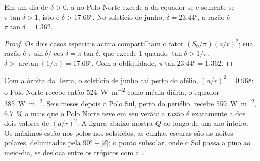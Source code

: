 \begin{proposition}\label{prop:b1:radiation-heat-transport:polar-summer}
Em um dia de  $\delta > 0$, a  no Polo Norte excede a do equador se
e somente se $\pi\tan\delta > 1$, isto é $\delta >
\ang{17.66}$. No solstício de junho, $\delta = \ang{23.44}$, a razão é $\pi\tan
\delta = 1.362$.
\end{proposition}

\begin{proof}
Os dois casos especiais acima compartilham o fator $(S_0/\pi)(a/r)^2$; sua razão é
$\pi\sin\delta/\cos\delta = \pi\tan\delta$, que excede 1 quando $\tan\delta >
1/\pi$, $\delta > \arctan(1/\pi) = \ang{17.66}$. Com a obliquidade, $\pi\tan\ang{23.44} = 1.362$.
\end{proof}

Com a órbita da Terra, o solstício de junho cai perto do afélio, $(a/r)^2 = 0.968$: o Polo Norte
recebe então \qty{524}{W.m^{-2}} como média diária, o equador \qty{385}{W.m^{-2}}. Seis meses
depois o Polo Sul, perto do periélio, recebe \qty{559}{W.m^{-2}}, \qty{6.7}{\percent} a mais que o
Polo Norte teve em seu verão: a razão é exatamente a dos dois valores de $(a/r)^2$. A figura abaixo
mostra $\bar Q$ ao longo de um ano inteiro. Os máximos estão nos polos nos solstícios; as cunhas
escuras são as noites polares, delimitadas pela  $\ang{90} -
|\delta|$; o ponto subsolar, onde o Sol passa a pino ao meio-dia, se desloca entre os trópicos
com a .

